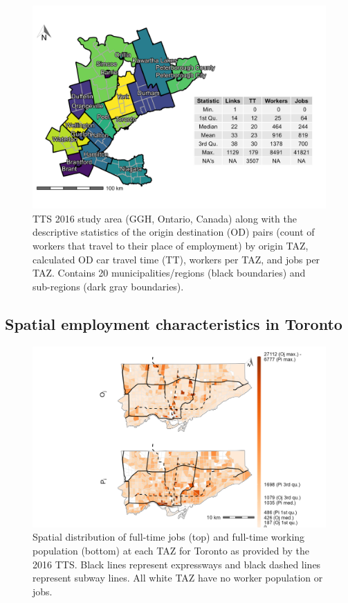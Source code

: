\documentclass[10pt,letterpaper]{article}
\begin{document}
\begin{figure}

{\centering \includegraphics[width=1\linewidth]{images/Fig3} 

}

\caption{\label{fig:Fig3}TTS 2016 study area (GGH, Ontario, Canada) along with the descriptive statistics of the origin destination (OD) pairs (count of workers that travel to their place of employment) by origin TAZ, calculated OD car travel time (TT), workers per TAZ, and jobs per TAZ. Contains 20 municipalities/regions (black boundaries) and sub-regions (dark gray boundaries).}\label{fig:TTS-16-survey-area}
\end{figure}

\hypertarget{spatial-employment-characteristics-in-toronto}{%
\subsection{Spatial employment characteristics in
Toronto}\label{spatial-employment-characteristics-in-toronto}}

\begin{figure}
\includegraphics[width=1\linewidth]{images/Fig4} \caption{\label{fig:Fig4}  Spatial distribution of full-time jobs (top) and full-time working population (bottom) at each TAZ for Toronto as provided by the 2016 TTS. Black lines represent expressways and black dashed lines represent subway lines. All white TAZ have no worker population or jobs.}\label{fig:spatial-dist-Toronto-plot}
\end{figure}
\end{document}
